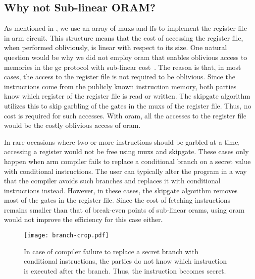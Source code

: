 \subsection{Why not Sub-linear ORAM?}
As mentioned in , we use an array of \acrshort{mux}s and \acrshort{ff}s to implement the register file in \gls{arm} circuit.
This structure means that the cost of accessing the register file, when performed obliviously, is linear with respect to its size.
One natural question would be why we did not employ \acrfull{oram} that enables oblivious access to memories in the \acrshort{gc} protocol with sub-linear cost~\cite{wang2014scoram, zahur2016revisit}.
The reason is that, in most cases, the access to the register file is not required to be oblivious.
Since the instructions come from the publicly known instruction memory, both parties know which register of the register file is read or written.
The \gls{skipgate} algorithm utilizes this to skip garbling of the gates in the \acrshort{mux}s of the register file.
Thus, no cost is required for such accesses.
With \acrshort{oram}, all the accesses to the register file would be the costly oblivious access of \acrshort{oram}.

In rare occasions where two or more instructions should be garbled at a time, accessing a register would not be free using \acrshort{mux}s and \gls{skipgate}.
These cases only happen when \gls{arm} compiler fails to replace a conditional branch on a secret value with conditional instructions.
The user can typically alter the program in a way that the compiler avoids such branches and replaces it with conditional instructions instead.
However, in these cases, the \gls{skipgate} algorithm removes most of the gates in the register file.
Since the cost of fetching instructions remains smaller than that of break-even points of sub-linear \acrshort{oram}s, using \acrshort{oram} would not improve the efficiency for this case either.

\begin{figure}
\centering
\texttt{[image: branch-crop.pdf]}
\caption{In case of compiler failure to replace a secret branch with conditional instructions, the parties do not know which instruction is executed after the branch.
Thus, the instruction becomes secret.}
\label{fig:branch}
\end{figure}

